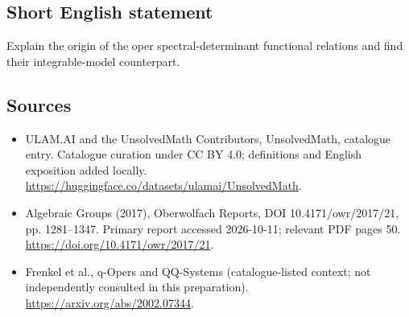 \documentclass[11pt]{article}
\begin{document}
\subsection{Short English statement}
Explain the origin of the oper spectral-determinant functional relations and find their integrable-model counterpart.
\subsection{Sources}
\begin{itemize}
\item[\hypertarget{source:statement:1}{S1}] ULAM.AI and the UnsolvedMath Contributors, UnsolvedMath, catalogue entry. Catalogue curation under CC BY 4.0; definitions and English exposition added locally.
\url{https://huggingface.co/datasets/ulamai/UnsolvedMath}.
\item[\hypertarget{source:statement:2}{S2}] Algebraic Groups (2017), Oberwolfach Reports, DOI 10.4171/owr/2017/21, pp. 1281--1347. Primary report accessed 2026-10-11; relevant PDF pages 50.
\url{https://doi.org/10.4171/owr/2017/21}.
\item[\hypertarget{source:statement:3}{S3}] Frenkel et al., q-Opers and QQ-Systems (catalogue-listed context; not independently consulted in this preparation).
\url{https://arxiv.org/abs/2002.07344}.
\end{itemize}
\label{end:statement}
\end{document}
